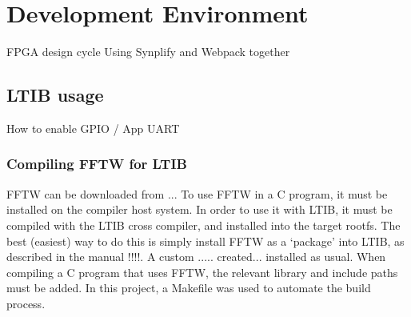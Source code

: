 \chapter{Development Environment} %
\label{apdx:development_environment}


FPGA design cycle
Using Synplify and Webpack together


\section{LTIB usage} %
\label{apdx:ltib_usage}

	How to enable GPIO / App UART

	\subsection{Compiling FFTW for LTIB} %
	\label{apdx:compiling_fftw_for_ltib}
		FFTW can be downloaded from ...
		To use FFTW in a C program, it must be installed on the compiler host system.  In order to use it with LTIB, it must be compiled with the LTIB cross compiler, and installed into the target rootfs.  The best (easiest) way to do this is simply install FFTW as a `package' into LTIB, as described in the manual !!!!.  A custom ..... created... installed as usual.
		When compiling a C program that uses FFTW, the relevant library and include paths must be added.  In this project, a Makefile was used to automate the build process.


